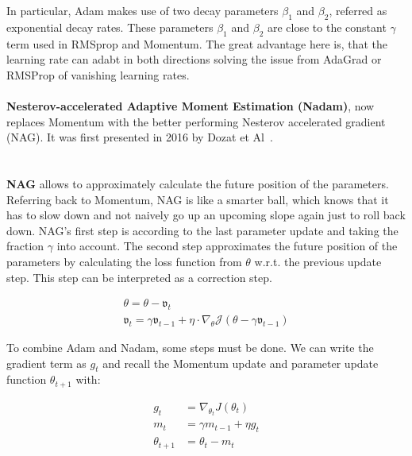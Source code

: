 In particular, Adam makes use of two decay parameters $\beta_1$ and $\beta_2$, referred as exponential decay rates.
These parameters $\beta_1$ and $\beta_2$ are close to the constant $\gamma$ term used in RMSprop and Momentum.
The great advantage here is, that the learning rate can adabt in both directions solving the issue from AdaGrad or
RMSProp of vanishing learning rates.
\\\mbox{}\\
\textbf{Nesterov-accelerated Adaptive Moment Estimation (Nadam)},
now replaces Momentum with the better performing
Nesterov accelerated gradient (NAG).
It was first presented in 2016 by Dozat et Al~\cite{nadam}.\\
\\\mbox{}\\
\textbf{NAG} allows to approximately calculate the future position of the parameters.
Referring back to Momentum, NAG is like a smarter ball, which knows that it has to slow down and not naively go up an upcoming
slope again just to roll back down.
NAG's first step is according to the last parameter update and taking the fraction $\gamma$ into account.
The second step approximates the future position of the parameters by calculating the loss function from $\theta$ w.r.t.
the previous update step.
This step can be interpreted as a correction step.

\begin{align}
    \theta = \theta - \mathfrak{v}_t \label{eqn:nag:1}\\
    \mathfrak{v}_t = \gamma\mathfrak{v}_{t-1} + \eta\cdot\nabla_\theta\mathcal{J}(\theta-\gamma\mathfrak{v}_{t-1}) \label{eqn:nag:2}
\end{align}

To combine Adam and Nadam, some steps must be done.
We can write the gradient term as $g_t$ and recall the Momentum update and parameter update function $\theta_{t+1}$ with:

\begin{align}
g_t &= \nabla_{\theta_t}J(\theta_t) \label{eqn:nadam:1} \\
m_t &= \gamma m_{t-1} + \eta g_t \label{eqn:nadam:2}\\
\theta_{t+1} &= \theta_t - m_t \label{eqn:nadam:3}
\end{align}

